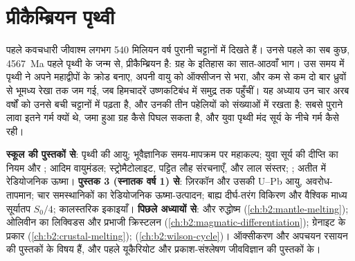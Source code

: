 \chapter{प्रीकैम्ब्रियन पृथ्वी}\label{ch:b2:precambrian-earth}

पहले कवचधारी जीवाश्म लगभग 540 मिलियन वर्ष पुरानी चट्टानों में दिखते हैं। उनसे पहले का सब कुछ,
\qty{4567}{Ma} पहले पृथ्वी के जन्म से, प्रीकैम्ब्रियन है: ग्रह के इतिहास का सात-आठवाँ भाग।
उस समय में पृथ्वी ने अपने महाद्वीपों के क्रोड बनाए, अपनी वायु को ऑक्सीजन से भरा,
और कम से कम दो बार ध्रुवों से भूमध्य रेखा तक जम गई, जब हिमचादरें उष्णकटिबंध में समुद्र तक
पहुँचीं। यह अध्याय उन चार अरब वर्षों को उनसे बची चट्टानों में पढ़ता है,
और उनकी तीन पहेलियों को संख्याओं में रखता है: सबसे पुराने लावा इतने गर्म क्यों थे, जमा हुआ
ग्रह कैसे पिघल सकता है, और युवा पृथ्वी मंद सूर्य के नीचे गर्म कैसे रही।

\begin{recall}
\textbf{स्कूल की पुस्तकों से}: पृथ्वी की आयु; भूवैज्ञानिक समय-मापक्रम पर महाकल्प;
युवा सूर्य की दीप्ति का नियम और ; आदिम वायुमंडल;
स्ट्रोमैटोलाइट, पट्टित लौह संरचनाएँ,  और लाल संस्तर; ;
अतीत में रेडियोजनिक ऊष्मा। \textbf{पुस्तक 3 (स्नातक वर्ष 1) से}: ज़िरकॉन और उसकी U--Pb आयु,
अवरोध-तापमान; चार समस्थानिकों का रेडियोजनिक ऊष्मा-उत्पादन; बाह्य दीर्घ-तरंग
विकिरण और वैश्विक माध्य सूर्यातप $S_0/4$; कालस्तरिक इकाइयाँ।
\textbf{पिछले अध्यायों से}:  और रुद्धोष्म
(\cref{ch:b2:mantle-melting}); ओलिवीन का लिक्विडस और प्रभाजी क्रिस्टलन
(\cref{ch:b2:magmatic-differentiation}); ग्रेनाइट के प्रकार (\cref{ch:b2:crustal-melting});
 (\cref{ch:b2:wilson-cycle})। ऑक्सीकरण और अपचयन रसायन की
पुस्तकों के विषय हैं, और पहले यूकैरियोट और प्रकाश-संश्लेषण जीवविज्ञान की पुस्तकों के।
\end{recall}

